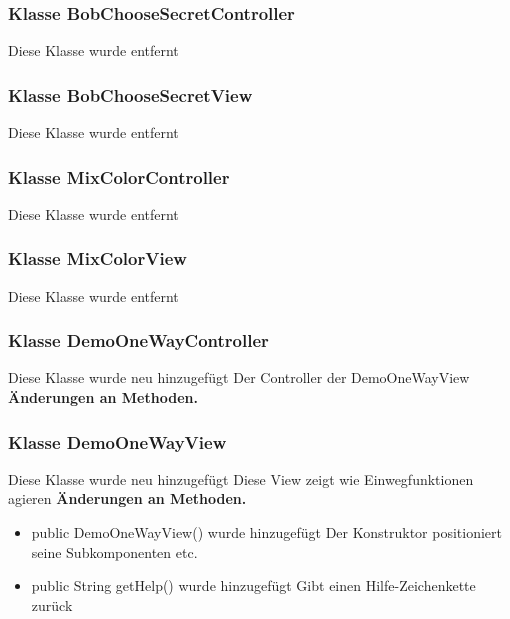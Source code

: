 \documentclass{article}
\begin{document}
	\subsubsection{Klasse BobChooseSecretController}
    Diese Klasse wurde entfernt

	\subsubsection{Klasse BobChooseSecretView}
    Diese Klasse wurde entfernt

	\subsubsection{Klasse MixColorController}
    Diese Klasse wurde entfernt

	\subsubsection{Klasse MixColorView}
    Diese Klasse wurde entfernt

	\subsubsection{Klasse DemoOneWayController}
    Diese Klasse wurde neu hinzugefügt
    Der Controller der DemoOneWayView
    \textbf{Änderungen an Methoden.}\newline
	   \begin{itemize}
           \end{itemize}

	\subsubsection{Klasse DemoOneWayView}
    Diese Klasse wurde neu hinzugefügt
    Diese View zeigt wie Einwegfunktionen agieren
    \textbf{Änderungen an Methoden.}\newline
	   \begin{itemize}
           \item public DemoOneWayView() wurde hinzugefügt\newline
               Der Konstruktor positioniert seine Subkomponenten etc.
           \item public String getHelp() wurde hinzugefügt\newline
               Gibt einen Hilfe-Zeichenkette zurück
           \end{itemize}
\end{document}
